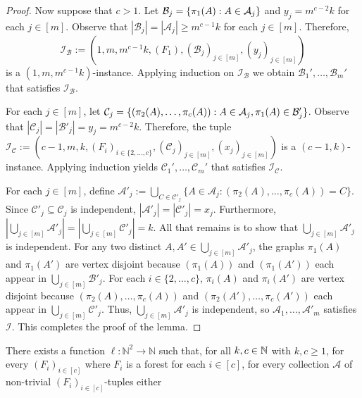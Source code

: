 \documentclass{patmorin}
\DeclarePairedDelimiter\set{\{}{\}}
\renewcommand{\mid}{:}  %
\begin{document}
\begin{proof}
  Now suppose that $c>1$. Let $\mathcal{B}_j=\set{\pi_1(A)\mid A\in\mathcal{A}_j}$ and $y_j=m^{c-2}k$ for each $j\in[m]$. Observe that $|\mathcal{B}_j|=|\mathcal{A}_j|\geq m^{c-1}k$ for each $j\in[m]$. Therefore,
  \[
    \mathcal{I}_{\mathcal{B}}:=(1,m,m^{c-1}k,(F_1),(\mathcal{B}_j)_{j\in[m]},(y_j)_{j\in[m]})
  \]
  is a $(1,m,m^{c-1}k)$-instance.  Applying induction on $\mathcal{I}_\mathcal{B}$ we obtain $\mathcal{B}_1',\ldots,\mathcal{B}_m'$ that satisfies $\mathcal{I}_{\mathcal{B}}$.

  For each $j\in[m]$, let $\mathcal{C}_j=\set{(\pi_2(A),\ldots,\pi_c(A))\mid A\in\mathcal{A}_j, \pi_1(A)\in \mathcal{B}'_j}$. Observe that $|\mathcal{C}_j|=|\mathcal{B}'_j|=y_j=m^{c-2}k$.  Therefore, the tuple $\mathcal{I}_{\mathcal{C}}:=(c-1,m,k,(F_i)_{i\in\{2,\ldots,c\}},(\mathcal{C}_j)_{j\in[m]},(x_j)_{j\in[m]})$ is a $(c-1,k)$-instance.  Applying induction yields $\mathcal{C}_1',\ldots,\mathcal{C}_m'$ that satisfies $\mathcal{I}_{\mathcal{C}}$.

  For each $j\in[m]$, define $\mathcal{A}'_j:=\bigcup_{C\in\mathcal{C}'_j}\{A\in\mathcal{A}_j\mid (\pi_2(A),\ldots,\pi_c(A))=C\}$.  Since $\mathcal{C}'_j\subseteq\mathcal{C}_j$ is independent,  $|\mathcal{A}'_j|=|\mathcal{C}'_j|=x_j$. Furthermore, $|\bigcup_{j\in[m]}\mathcal{A}'_j|=|\bigcup_{j\in[m]}\mathcal{C}'_j|=k$. All that remains is to show that $\bigcup_{j\in[m]}\mathcal{A}'_j$ is independent. For any two distinct $A,A'\in\bigcup_{j\in[m]}\mathcal{A}'_j$, the graphs $\pi_1(A)$ and $\pi_1(A')$ are vertex disjoint because $(\pi_1(A))$ and $(\pi_1(A'))$ each appear in $\bigcup_{j\in[m]}\mathcal{B}'_j$.  For each $i\in\{2,\ldots,c\}$, $\pi_i(A)$ and $\pi_i(A')$ are vertex disjoint because $(\pi_2(A),\ldots,\pi_c(A))$ and $(\pi_2(A'),\ldots,\pi_c(A'))$ each appear in $\bigcup_{j\in[m]}\mathcal{C}'_j$.  Thus, $\bigcup_{j\in[m]}\mathcal{A}'_j$ is independent, so $\mathcal{A}_1,\ldots,\mathcal{A}'_m$ satisfies $\mathcal{I}$.  This completes the proof of the lemma.
\end{proof}

\begin{lem}\label{lem:hungarians-Fi-tuples}
There exists a function $\ell:\mathbb{N}^2\to\mathbb{N}$ such that, for all $k,c\in\mathbb{N}$ with $k,c\ge 1$, for every $(F_i)_{i\in[c]}$ where $F_i$ is a forest for each $i\in[c]$, for every collection $\mathcal{A}$ of non-trivial $(F_i)_{i\in[c]}$-tuples either
\end{lem}
\end{document}
